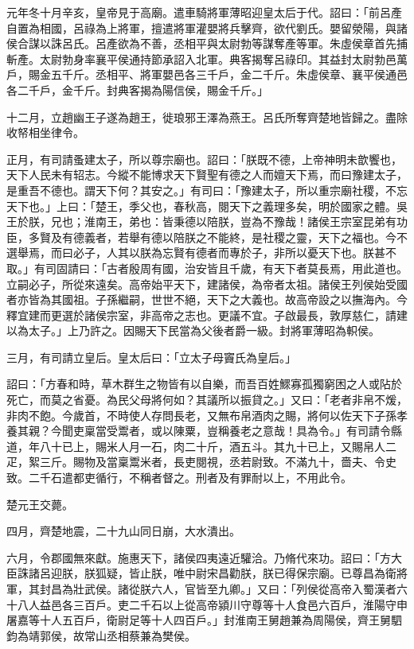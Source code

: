\begin{pinyinscope}
元年冬十月辛亥，皇帝見于高廟。遣車騎將軍薄昭迎皇太后于代。詔曰：「前呂產自置為相國，呂祿為上將軍，擅遣將軍灌嬰將兵擊齊，欲代劉氏。嬰留滎陽，與諸侯合謀以誅呂氏。呂產欲為不善，丞相平與太尉勃等謀奪產等軍。朱虛侯章首先捕斬產。太尉勃身率襄平侯通持節承詔入北軍。典客揭奪呂祿印。其益封太尉勃邑萬戶，賜金五千斤。丞相平、將軍嬰邑各三千戶，金二千斤。朱虛侯章、襄平侯通邑各二千戶，金千斤。封典客揭為陽信侯，賜金千斤。」

十二月，立趙幽王子遂為趙王，徙琅邪王澤為燕王。呂氏所奪齊楚地皆歸之。盡除收帑相坐律令。

正月，有司請蚤建太子，所以尊宗廟也。詔曰：「朕既不德，上帝神明未歆饗也，天下人民未有轺志。今縱不能博求天下賢聖有德之人而嬗天下焉，而曰豫建太子，是重吾不德也。謂天下何？其安之。」有司曰：「豫建太子，所以重宗廟社稷，不忘天下也。」上曰：「楚王，季父也，春秋高，閱天下之義理多矣，明於國家之體。吳王於朕，兄也；淮南王，弟也：皆秉德以陪朕，豈為不豫哉！諸侯王宗室昆弟有功臣，多賢及有德義者，若舉有德以陪朕之不能終，是社稷之靈，天下之福也。今不選舉焉，而曰必子，人其以朕為忘賢有德者而專於子，非所以憂天下也。朕甚不取。」有司固請曰：「古者殷周有國，治安皆且千歲，有天下者莫長焉，用此道也。立嗣必子，所從來遠矣。高帝始平天下，建諸侯，為帝者太祖。諸侯王列侯始受國者亦皆為其國祖。子孫繼嗣，世世不絕，天下之大義也。故高帝設之以撫海內。今釋宜建而更選於諸侯宗室，非高帝之志也。更議不宜。子啟最長，敦厚慈仁，請建以為太子。」上乃許之。因賜天下民當為父後者爵一級。封將軍薄昭為軹侯。

三月，有司請立皇后。皇太后曰：「立太子母竇氏為皇后。」

詔曰：「方春和時，草木群生之物皆有以自樂，而吾百姓鰥寡孤獨窮困之人或阽於死亡，而莫之省憂。為民父母將何如？其議所以振貸之。」又曰：「老者非帛不煖，非肉不飽。今歲首，不時使人存問長老，又無布帛酒肉之賜，將何以佐天下子孫孝養其親？今聞吏稟當受鬻者，或以陳粟，豈稱養老之意哉！具為令。」有司請令縣道，年八十已上，賜米人月一石，肉二十斤，酒五斗。其九十已上，又賜帛人二疋，絮三斤。賜物及當稟鬻米者，長吏閱視，丞若尉致。不滿九十，嗇夫、令史致。二千石遣都吏循行，不稱者督之。刑者及有罪耐以上，不用此令。

楚元王交薨。

四月，齊楚地震，二十九山同日崩，大水潰出。

六月，令郡國無來獻。施惠天下，諸侯四夷遠近驩洽。乃脩代來功。詔曰：「方大臣誅諸呂迎朕，朕狐疑，皆止朕，唯中尉宋昌勸朕，朕已得保宗廟。已尊昌為衛將軍，其封昌為壯武侯。諸從朕六人，官皆至九卿。」又曰：「列侯從高帝入蜀漢者六十八人益邑各三百戶。吏二千石以上從高帝潁川守尊等十人食邑六百戶，淮陽守申屠嘉等十人五百戶，衛尉足等十人四百戶。」封淮南王舅趙兼為周陽侯，齊王舅駟鈞為靖郭侯，故常山丞相蔡兼為樊侯。


\end{pinyinscope}
